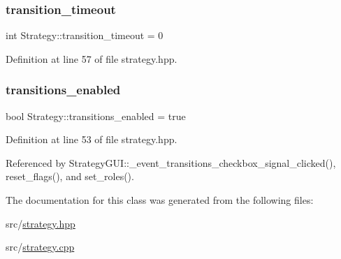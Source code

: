 \subsubsection{\texorpdfstring{transition\+\_\+timeout}{transition\_timeout}}
{\footnotesize\ttfamily int Strategy\+::transition\+\_\+timeout = 0}



Definition at line 57 of file strategy.\+hpp.

\mbox{\label{class_strategy_a6d59806a95ef79a25d30c4f139c94671}} 
\subsubsection{\texorpdfstring{transitions\+\_\+enabled}{transitions\_enabled}}
{\footnotesize\ttfamily bool Strategy\+::transitions\+\_\+enabled = true}



Definition at line 53 of file strategy.\+hpp.



Referenced by Strategy\+G\+U\+I\+::\+\_\+event\+\_\+transitions\+\_\+checkbox\+\_\+signal\+\_\+clicked(), reset\+\_\+flags(), and set\+\_\+roles().



The documentation for this class was generated from the following files\+:\begin{DoxyCompactItemize}
\item 
src/\hyperlink{strategy_8hpp}{strategy.\+hpp}\item 
src/\hyperlink{strategy_8cpp}{strategy.\+cpp}\end{DoxyCompactItemize}
